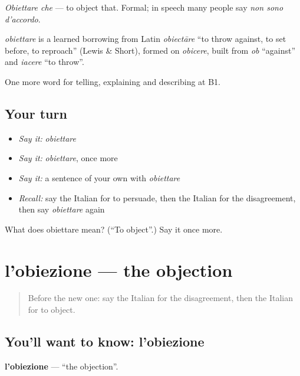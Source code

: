\emph{Obiettare che} — to object that. Formal; in speech many people say \emph{non sono d'accordo}.

\begin{cousinweb}
\emph{obiettare} is a learned borrowing from Latin \emph{obiectāre} \textquotedblleft{}to throw against, to set before, to reproach\textquotedblright{} (Lewis \& Short), formed on \emph{obicere}, built from \emph{ob} \textquotedblleft{}against\textquotedblright{} and \emph{iacere} \textquotedblleft{}to throw\textquotedblright{}.
\end{cousinweb}

\begin{grammarlens}[title={What you've built}]
One more word for telling, explaining and describing at B1.
\end{grammarlens}

\subsection*{Your turn}
\begin{itemize}
\raggedright
  \item \emph{Say it:} \emph{obiettare}
  \item \emph{Say it:} \emph{obiettare}, once more
  \item \emph{Say it:} a sentence of your own with \emph{obiettare}
  \item \emph{Recall:} say the Italian for to persuade, then the Italian for the disagreement, then say \emph{obiettare} again
\end{itemize}

\begin{tcolorbox}[breakable,colback=teal!4,colframe=teal!35!black,title={Before you move on}]
What does obiettare mean? (\textquotedblleft{}To object\textquotedblright{}.) Say it once more.
\end{tcolorbox}
\section[l'obiezione]{l'obiezione — the objection}

\label{lesson:IT-C341-obiezione}



\begin{quote}
Before the new one: say the Italian for the disagreement, then the Italian for to object.
\end{quote}

\subsection*{You'll want to know: l'obiezione}
\textbf{l'obiezione} — \textquotedblleft{}the objection\textquotedblright{}.

